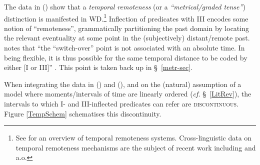 The data in () show that a \textit{temporal remoteness} (or a \textit{``metrical/graded tense''}) distinction is manifested in WD.\footnote{See \citet[Ch. 4]{Comrie1985} for an overview of temporal remoteness systems. Cross-linguistic data on temporal remoteness mechanisms are the subject of recent work including \citealt{Klecha2016,Cable2013,Bohnemeyer2018,Hayashi2015} and \citealt{Martin2010} a.o.} Inflection of predicates with \gls{III} encodes some notion of ``remoteness'', grammatically partitioning the past domain by locating the relevant eventuality at some point in the (subjectively) distant/remote past. \citeauthor{Wilkinson1991} notes that ``the ``switch-over'' point is not associated with an absolute time. In being flexible, it is thus possible for the same temporal distance to be coded by either [\gls{I} or \gls{III}]'' \citeyearpar[343]{Wilkinson1991}. This point is taken back up in \S~\ref{metr-sec}.


When integrating the data in () and (), and on the (natural) assumption of a model where moments/intervals of time are linearly ordered (\textit{cf.} \S~\ref{LitRev}), the intervals to which \gls{I}- and \gls{III}-inflected predicates can refer are \textsc{discontinuous.} Figure \ref{TempSchem} schematises this discontinuity.


